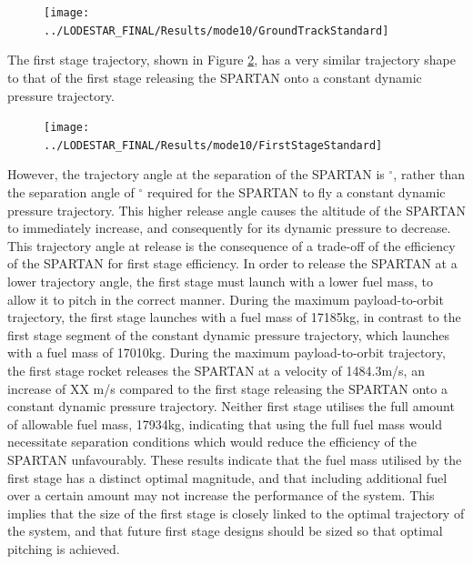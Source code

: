 \begin{figure}[ht!]
	
	
	
	\centering
	\texttt{[image: ../LODESTAR\_FINAL/Results/mode10/GroundTrackStandard]}
	\caption{}
	\label{fig:GroundTrackStandardNoReturn}
\end{figure}


The first stage trajectory, shown in Figure \ref{fig:FirstStageStandardNoReturn}, has a very similar trajectory shape to that of the first stage releasing the SPARTAN onto a constant dynamic pressure trajectory.
\begin{figure}[ht!]
	\centering
	\texttt{[image: ../LODESTAR\_FINAL/Results/mode10/FirstStageStandard]}
	\caption{}
	\label{fig:FirstStageStandardNoReturn}
\end{figure}
 However, the trajectory angle at the separation of the SPARTAN is \secondthirdSeparationgammaqStandardNoReturn$^\circ$, rather than the separation angle of \secondthirdSeparationgammaConstq$^\circ$ required for the SPARTAN to fly a constant dynamic pressure trajectory. This higher release angle causes the altitude of the SPARTAN to immediately increase, and consequently for its dynamic pressure to decrease. This trajectory angle at release is the consequence of a trade-off of the efficiency of the SPARTAN for first stage efficiency. In order to release the SPARTAN at a lower trajectory angle, the first stage must launch with a lower fuel mass, to allow it to pitch in the correct manner. During the maximum payload-to-orbit trajectory, the first stage launches with a fuel mass of 17185kg, in contrast to the first stage segment of the constant dynamic pressure trajectory, which launches with a fuel mass of 17010kg. During the maximum payload-to-orbit trajectory, the first stage rocket releases the SPARTAN at a velocity of 1484.3m/s, an increase of XX m/s compared to the first stage releasing the SPARTAN onto a constant dynamic pressure trajectory. Neither first stage utilises the full amount of allowable fuel mass, 17934kg, indicating that using the full fuel mass would necessitate separation conditions which would reduce the efficiency of the SPARTAN unfavourably. 
These results indicate that the fuel mass utilised by the first stage has a distinct optimal magnitude, and that including additional fuel over a certain amount may not increase the performance of the system. This implies that the size of the first stage is closely linked to the optimal trajectory of the system, and that future first stage designs should be sized so that optimal pitching is achieved. 

